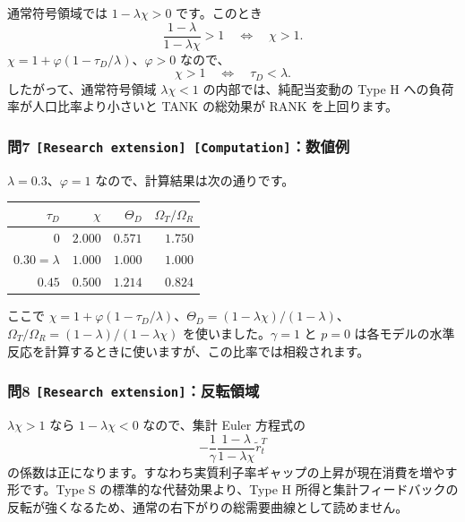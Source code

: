 \documentclass[
  japanese,
  lualatex,
  ja=standard,
  11pt,
  a4paper]{ltjsarticle}
\newcounter{none} %
\begin{document}
通常符号領域では \(1-\lambda\chi>0\) です。このとき \[
\frac{1-\lambda}{1-\lambda\chi}>1
\quad\Longleftrightarrow\quad
\chi>1.
\] \(\chi=1+\varphi(1-\tau_D/\lambda)\)、\(\varphi>0\) なので、 \[
\chi>1
\quad\Longleftrightarrow\quad
\tau_D<\lambda.
\] したがって、通常符号領域 \(\lambda\chi<1\) の内部では、純配当変動の
Type H への負荷率が人口比率より小さいと TANK の総効果が RANK
を上回ります。

\subsubsection{\texorpdfstring{問7
\texttt{{[}Research\ extension{]}\ {[}Computation{]}}：数値例}{問7 {[}Research extension{]} {[}Computation{]}：数値例}}\label{ux554f7-research-extension-computationux6570ux5024ux4f8b}

\(\lambda=0.3\)、\(\varphi=1\) なので、計算結果は次の通りです。

{\def\LTcaptype{none} %
\begin{longtable}[]{@{}rrrr@{}}
\toprule\noalign{}
\(\tau_D\) & \(\chi\) & \(\Theta_D\) & \(\Omega_T/\Omega_R\) \\
\midrule\noalign{}
\endhead
\bottomrule\noalign{}
\endlastfoot
\(0\) & \(2.000\) & \(0.571\) & \(1.750\) \\
\(0.30=\lambda\) & \(1.000\) & \(1.000\) & \(1.000\) \\
\(0.45\) & \(0.500\) & \(1.214\) & \(0.824\) \\
\end{longtable}
}

ここで
\(\chi=1+\varphi(1-\tau_D/\lambda)\)、\(\Theta_D=(1-\lambda\chi)/(1-\lambda)\)、\(\Omega_T/\Omega_R=(1-\lambda)/(1-\lambda\chi)\)
を使いました。\(\gamma=1\) と \(p=0\)
は各モデルの水準反応を計算するときに使いますが、この比率では相殺されます。

\subsubsection{\texorpdfstring{問8
\texttt{{[}Research\ extension{]}}：反転領域}{問8 {[}Research extension{]}：反転領域}}\label{ux554f8-research-extensionux53cdux8ee2ux9818ux57df}

\(\lambda\chi>1\) なら \(1-\lambda\chi<0\) なので、集計 Euler 方程式の
\[
-\frac1\gamma\frac{1-\lambda}{1-\lambda\chi}
\widetilde r_t^T
\]
の係数は正になります。すなわち実質利子率ギャップの上昇が現在消費を増やす形です。Type
S の標準的な代替効果より、Type H
所得と集計フィードバックの反転が強くなるため、通常の右下がりの総需要曲線として読めません。
\end{document}
